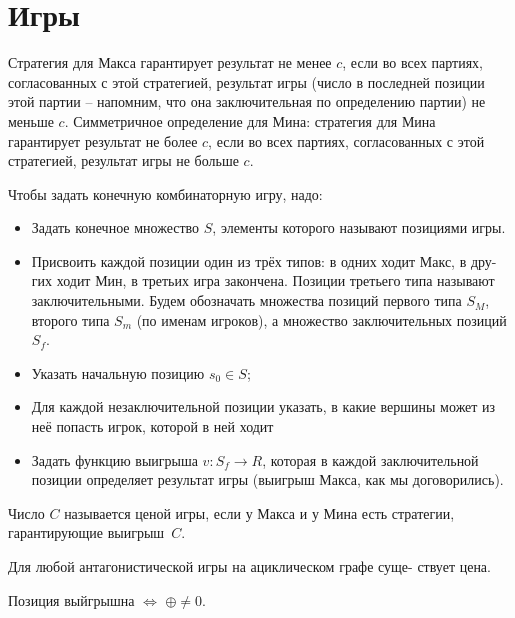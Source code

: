 \documentclass{article}
\newcommand{\lra}{\Leftrightarrow}
\newcommand*{\xor}{\mathbin{\oplus}}
\newenvironment{theorem}[2][Теорема]{\begin{trivlist}
\item[\hskip \labelsep {\bfseries #1}\hskip \labelsep {\bfseries #2.}]}{\end{trivlist}}
\newenvironment{definition}[2][Определение]{\begin{trivlist}
\item[\hskip \labelsep {\bfseries #1}\hskip \labelsep {\bfseries #2}]}{\end{trivlist}}
\begin{document}
\section{Игры}

\begin{definition}{Согласованность.}
Стратегия для Макса гарантирует результат не менее $c$, если
во всех партиях, согласованных $с$ этой стратегией, результат игры (число в последней позиции этой партии -- напомним, что она заключительная по определению
партии) не меньше $c$. Симметричное определение для Мина: стратегия для Мина
гарантирует результат не более $c$, если во всех партиях, согласованных $с$ этой
стратегией, результат игры не больше $c$.
\end{definition}
\begin{definition}{Конечная комб игра}
Чтобы задать конечную комбинаторную игру, надо:
\begin{itemize}
\item Задать конечное множество $S$, элементы которого называют позициями игры.
\item Присвоить каждой позиции один из трёх типов: в одних ходит Макс, в дру-
гих ходит Мин, в третьих игра закончена. Позиции третьего типа называют
заключительными. Будем обозначать множества позиций первого типа $S_M$,
второго типа $S_m$ (по именам игроков), а множество заключительных позиций
$S_f$.
\item Указать начальную позицию $s_0 \in S$;
\item Для каждой незаключительной позиции указать, в какие вершины может из
неё попасть игрок, которой в ней ходит
\item Задать функцию выигрыша $v : S_f \to R$, которая в каждой заключительной
позиции определяет результат игры (выигрыш Макса, как мы договорились).
\end{itemize}
\end{definition}

\begin{definition}{Цена игры.}
Число $C$ называется ценой игры, если у Макса и у Мина есть
стратегии, гарантирующие выигрыш~$C$.
\end{definition}

\begin{theorem}{Существование цены.}
Для любой антагонистической игры на ациклическом графе суще-
ствует цена.
\end{theorem}

\begin{theorem}{Ним}
Позиция выйгрышна $\lra$ $\xor \neq 0$. 
\end{theorem}
\end{document}
